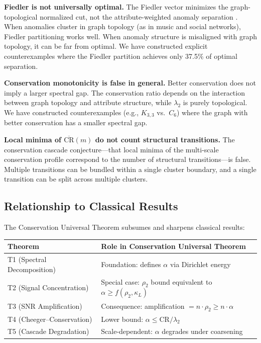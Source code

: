 \documentclass[12pt,letterpaper]{article}
\newcommand{\CR}{\mathrm{CR}}
\begin{document}
\textbf{Fiedler is not universally optimal.} The Fiedler vector minimizes the graph-topological normalized cut, not the attribute-weighted anomaly separation \citep{shi2000}. When anomalies cluster in graph topology (as in music and social networks), Fiedler partitioning works well. When anomaly structure is misaligned with graph topology, it can be far from optimal. We have constructed explicit counterexamples where the Fiedler partition achieves only 37.5\% of optimal separation.

\textbf{Conservation monotonicity is false in general.} Better conservation does not imply a larger spectral gap. The conservation ratio depends on the interaction between graph topology and attribute structure, while $\lambda_2$ is purely topological. We have constructed counterexamples (e.g., $K_{3,3}$ vs.\ $C_6$) where the graph with better conservation has a smaller spectral gap.

\textbf{Local minima of $\overline{\CR}(m)$ do not count structural transitions.} The conservation cascade conjecture---that local minima of the multi-scale conservation profile correspond to the number of structural transitions---is false. Multiple transitions can be bundled within a single cluster boundary, and a single transition can be split across multiple clusters.

\subsection{Relationship to Classical Results}

The Conservation Universal Theorem subsumes and sharpens classical results:

\begin{center}
\begin{tabular}{ll}
  \toprule
  Theorem & Role in Conservation Universal Theorem \\
  \midrule
  T1 (Spectral Decomposition) & Foundation: defines $\alpha$ via Dirichlet energy \\
  T2 (Signal Concentration) & Special case: $\rho_2$ bound equivalent to $\alpha \geq f(\rho_2, \kappa_L)$ \\
  T3 (SNR Amplification) & Consequence: amplification $= n \cdot \rho_2 \geq n \cdot \alpha$ \\
  T4 (Cheeger--Conservation) & Lower bound: $\alpha \leq \CR/\lambda_2$ \\
  T5 (Cascade Degradation) & Scale-dependent: $\alpha$ degrades under coarsening \\
  \bottomrule
\end{tabular}
\end{center}
\end{document}
